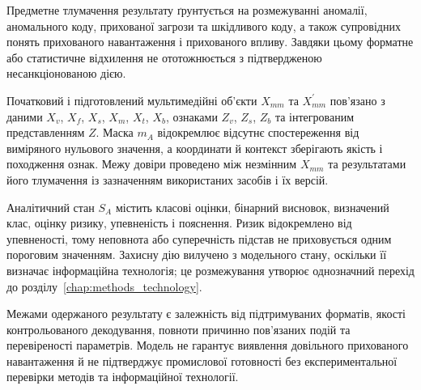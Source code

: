 Предметне тлумачення результату ґрунтується на розмежуванні аномалії, аномального коду, прихованої загрози та шкідливого коду, а також супровідних понять прихованого навантаження і прихованого впливу. Завдяки цьому форматне або статистичне відхилення не ототожнюється з підтвердженою несанкціонованою дією.

Початковий і підготовлений мультимедійні об’єкти $X_{mm}$ та $X_{mm}^{\prime}$ пов’язано з даними $X_v$, $X_f$, $X_s$, $X_m$, $X_t$, $X_b$, ознаками $Z_v$, $Z_s$, $Z_b$ та інтегрованим представленням $Z$. Маска $m_A$ відокремлює відсутнє спостереження від виміряного нульового значення, а координати й контекст зберігають якість і походження ознак. Межу довіри проведено між незмінним $X_{mm}$ та результатами його тлумачення із зазначенням використаних засобів і їх версій.

Аналітичний стан $S_A$ містить класові оцінки, бінарний висновок, визначений клас, оцінку ризику, упевненість і пояснення. Ризик відокремлено від упевненості, тому неповнота або суперечність підстав не приховується одним пороговим значенням. Захисну дію вилучено з модельного стану, оскільки її визначає інформаційна технологія; це розмежування утворює однозначний перехід до розділу~\ref{chap:methods_technology}.

Межами одержаного результату є залежність від підтримуваних форматів, якості контрольованого декодування, повноти причинно пов’язаних подій та перевіреності параметрів. Модель не гарантує виявлення довільного прихованого навантаження й не підтверджує промислової готовності без експериментальної перевірки методів та інформаційної технології.
